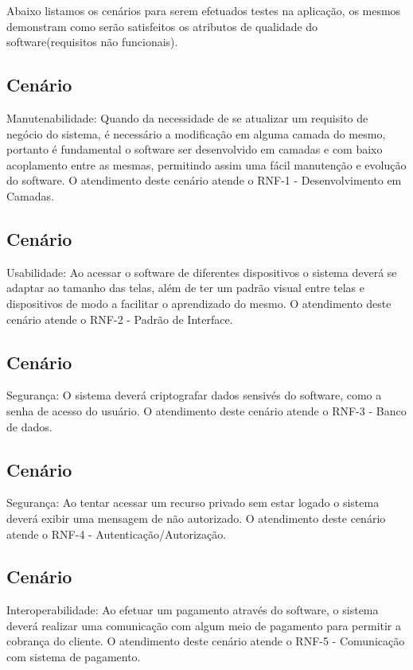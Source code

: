 Abaixo listamos os cenários para serem efetuados testes na aplicação, os mesmos demonstram como serão satisfeitos os 
atributos de qualidade do software(requisitos não funcionais).

\pgfmathtruncatemacro{}
\subsection{Cenário \cen} 
Manutenabilidade: Quando da necessidade de se atualizar um requisito de negócio do sistema, é necessário a modificação
em alguma camada do mesmo, portanto é fundamental o software ser desenvolvido em camadas e com baixo acoplamento 
entre as mesmas, permitindo assim uma fácil manutenção e evolução do software. O atendimento deste cenário atende o 
RNF-1 - Desenvolvimento em Camadas.

\pgfmathtruncatemacro{}
\subsection{Cenário \cen} 
Usabilidade: Ao acessar o software de diferentes dispositivos o sistema deverá se adaptar ao tamanho das telas, além de 
ter um padrão visual entre telas e dispositivos de modo a facilitar o aprendizado do mesmo. O atendimento deste cenário 
atende o RNF-2 - Padrão de Interface.

\pgfmathtruncatemacro{}
\subsection{Cenário \cen} 
Segurança: O sistema deverá criptografar dados sensivés do software, como a senha de acesso do usuário. O atendimento deste cenário 
atende o RNF-3 - Banco de dados.

\pgfmathtruncatemacro{}
\subsection{Cenário \cen} 
Segurança: Ao tentar acessar um recurso privado sem estar logado o sistema deverá exibir uma mensagem de não autorizado. O atendimento deste cenário 
atende o RNF-4 - Autenticação/Autorização.

\pgfmathtruncatemacro{}
\subsection{Cenário \cen} 
Interoperabilidade: Ao efetuar um pagamento através do software, o sistema deverá realizar uma comunicação com algum meio de pagamento para permitir a cobrança do cliente. O atendimento deste cenário 
atende o RNF-5 - Comunicação com sistema de pagamento.


